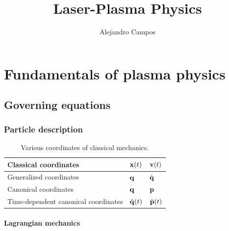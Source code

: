 \documentclass[a4paper,11pt]{report}
\title{Laser-Plasma Physics}
\author{Alejandro Campos}
\newcommand{\qvecdot}{\dot{\qvec}}
\begin{document}
\maketitle
\tableofcontents

\part{Fundamentals of plasma physics}

\chapter{Governing equations}

\section{Particle description}
\begin{table}[H]
    \renewcommand{\arraystretch}{1.5}
    \centering
    \caption{Various coordinates of classical mechanics. }
    \label{tb:classical_mechanics_coordinates}
     \begin{tabular}{|l|l|l|}
        \hline
        Classical coordinates & $\mathbf{x}(t)$ & $\mathbf{v}(t)$ \\
        \hline
        Generalized coordinates  & $\mathbf{q}$ & $\qvecdot$ \\
        \hline
        Canonical coordinates & $\mathbf{q}$ & $\mathbf{p}$ \\
        \hline
        Time-dependent canonical coordinates & $\tilde{\mathbf{q}}(t)$ & $ \tilde{\mathbf{p}}(t)$ \\
        \hline
     \end{tabular}
\end{table}
    
\subsection{Lagrangian mechanics}
    
\end{document}

